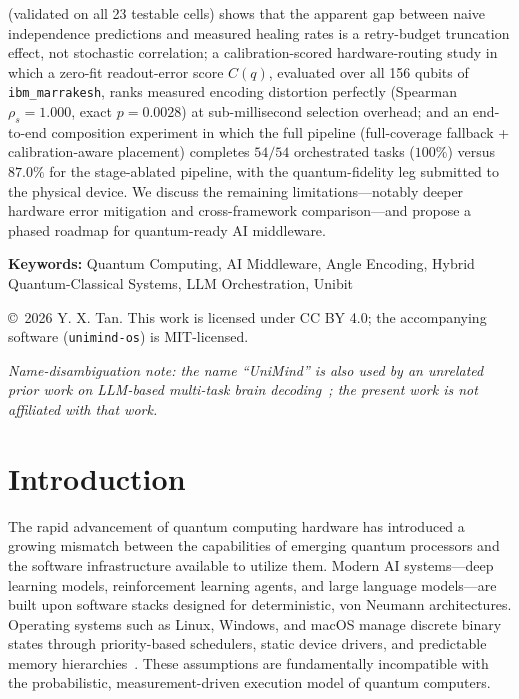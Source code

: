﻿\documentclass[12pt,a4paper]{article}
\begin{document}
\begin{titlepage}
\begin{minipage}{0.92\textwidth}
(validated on all 23 testable cells) shows that the apparent gap between naive independence predictions and measured healing rates is a retry-budget truncation effect, not stochastic correlation; a calibration-scored hardware-routing study in which a zero-fit readout-error score $C(q)$, evaluated over all 156 qubits of \texttt{ibm\_marrakesh}, ranks measured encoding distortion perfectly (Spearman $\rho_s = 1.000$, exact $p = 0.0028$) at sub-millisecond selection overhead; and an end-to-end composition experiment in which the full pipeline (full-coverage fallback + calibration-aware placement) completes $54/54$ orchestrated tasks ($100\%$) versus $87.0\%$ for the stage-ablated pipeline, with the quantum-fidelity leg submitted to the physical device. We discuss the remaining limitations---notably deeper hardware error mitigation and cross-framework comparison---and propose a phased roadmap for quantum-ready AI middleware.
\end{minipage}

\vspace{0.8cm}

\noindent\textbf{Keywords:} Quantum Computing, AI Middleware, Angle Encoding, Hybrid Quantum-Classical Systems, LLM Orchestration, Unibit

\vfill

{\small\copyright\ 2026 Y. X. Tan. This work is licensed under CC BY 4.0; the accompanying software (\texttt{unimind-os}) is MIT-licensed.}

\vspace{0.4cm}

{\small\itshape Name-disambiguation note: the name ``UniMind'' is also used by an unrelated prior work on LLM-based multi-task brain decoding~\cite{lu2025unimind}; the present work is not affiliated with that work.\par}

\end{titlepage}

\tableofcontents
\newpage

\section{Introduction}

The rapid advancement of quantum computing hardware has introduced a growing mismatch between the capabilities of emerging quantum processors and the software infrastructure available to utilize them. Modern AI systems---deep learning models, reinforcement learning agents, and large language models---are built upon software stacks designed for deterministic, von Neumann architectures. Operating systems such as Linux, Windows, and macOS manage discrete binary states through priority-based schedulers, static device drivers, and predictable memory hierarchies~\cite{tanenbaum2023}. These assumptions are fundamentally incompatible with the probabilistic, measurement-driven execution model of quantum computers.
\end{document}
